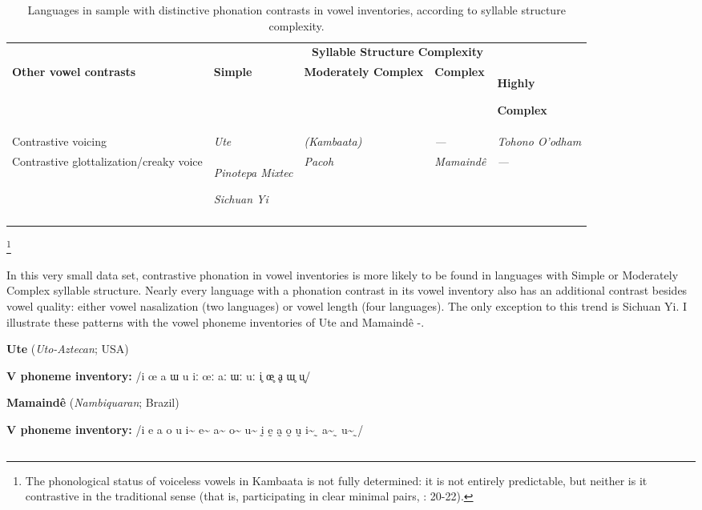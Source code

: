 \begin{table}
\begin{tabularx}{\textwidth}{XXXXX}
 & \multicolumn{4}{c}{ \textbf{Syllable Structure Complexity}}\\
\lsptoprule
\textbf{Other vowel contrasts} & \textbf{Simple} & \textbf{Moderately Complex} & \textbf{Complex} & { \textbf{Highly} }

 \textbf{Complex}\\
Contrastive voicing & \textit{Ute} & \textit{(Kambaata)} & \textit{—} & \textit{Tohono O’odham}\\
Contrastive glottalization/creaky voice & { \textit{Pinotepa Mixtec}}

 \textit{Sichuan Yi} & \textit{Pacoh} & \textit{Mamaindê} & \textit{—}\\
\lspbottomrule
\end{tabularx}
\caption{\label{tab:4.5}Languages in sample with distinctive phonation contrasts in vowel inventories, according to syllable structure complexity.}
\footnote{{The phonological status of voiceless vowels in Kambaata is not fully determined: it is not entirely predictable, but neither is it contrastive in the traditional sense (that is, participating in clear minimal pairs, \citealt{Treis2008}: 20-22).}}
\end{table}

  In this very small data set, contrastive phonation in vowel inventories is more likely to be found in languages with Simple or Moderately Complex syllable structure. Nearly every language with a phonation contrast in its vowel inventory also has an additional contrast besides vowel quality: either vowel nasalization (two languages) or vowel length (four languages). The only exception to this trend is Sichuan Yi. I illustrate these patterns with the vowel phoneme inventories of Ute and Mamaindê -.

\ea\label{ex:4.15}
  \textbf{Ute} (\textit{Uto-Aztecan}; USA)

\textbf{V phoneme inventory:} /i œ a ɯ u iː œː aː ɯː uː i̥ œ̥ ḁ ɯ̥ u̥/
\z

\ea\label{ex:4.16}
  \textbf{Mamaindê} (\textit{Nambiquaran}; Brazil)

\textbf{V phoneme inventory:} /i e a o u i\~{}  e\~{}  a\~{}  o\~{}  u\~{}  ḭ ḛ a̰ o̰ ṵ i\~{} ̰ a\~{} ̰ u\~{} ̰/
\z

\subsection{\rmfamily} 
